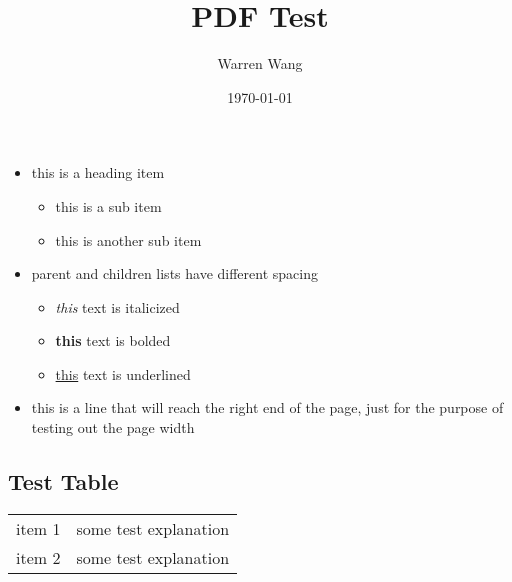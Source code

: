 \documentclass{article}
\title{PDF Test}
\author{Warren Wang}
\date{\today}
\begin{document}
	\maketitle
	\begin{itemize}
		\item this is a heading item
		\begin{itemize}[topsep=0pt, itemsep=0pt, partopsep=0pt]
			\item this is a sub item
			\item this is another sub item
		\end{itemize}
		\item parent and children lists have different spacing
		\begin{itemize}[topsep=0pt, itemsep=0pt, partopsep=0pt]
			\item \textit{this} text is italicized
			\item \textbf{this} text is bolded
			\item \underline{this} text is underlined
		\end{itemize}
		\item this is a line that will reach the right end of the page, just for the purpose of testing out the page width
	\end{itemize}
	\setlength{\parskip}{-3pt}\subsection*{Test Table}
	\hspace{0.25in}\begin{tabularx}{\textwidth-0.25in}{ >{\raggedright}p{4in} | X }
		item 1 & some test explanation \\
		item 2 & some test explanation
	\end{tabularx}
\end{document}
